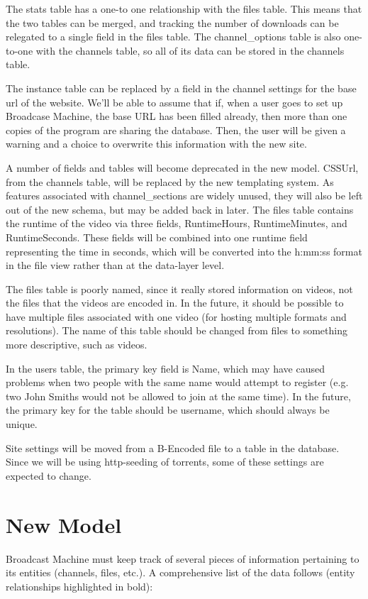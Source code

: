 \documentclass[a4paper,12pt]{report}
\begin{document}
The stats table has a one-to one relationship with the files table. This means that the two tables can be merged, and tracking the number of downloads can be relegated to a single field in the files table. The channel\_options table is also one-to-one with the channels table, so all of its data can be stored in the channels table.


The instance table can be replaced by a field in the channel settings for the base url of the website. We'll be able to assume that if, when a user goes to set up Broadcase Machine, the base URL has been filled already, then more than one copies of the program are sharing the database. Then, the user will be given a warning and a choice to overwrite this information with the new site.


A number of fields and tables will become deprecated in the new model. CSSUrl, from the channels table, will be replaced by the new templating system. As features associated with channel\_sections are widely unused, they will also be left out of the new schema, but may be added back in later. The files table contains the runtime of the video via three fields, RuntimeHours, RuntimeMinutes, and RuntimeSeconds. These fields will be combined into one runtime field representing the time in seconds, which will be converted into the h:mm:ss format in the file view rather than at the data-layer level.


The files table is poorly named, since it really stored information on videos, not the files that the videos are encoded in. In the future, it should be possible to have multiple files associated with one video (for hosting multiple formats and resolutions). The name of this table should be changed from files to something more descriptive, such as videos.


In the users table, the primary key field is Name, which may have caused problems when two people with the same name would attempt to register (e.g. two John Smiths would not be allowed to join at the same time). In the future, the primary key for the table should be username, which should always be unique.


Site settings will be moved from a B-Encoded file to a table in the database. Since we will be using http-seeding of torrents, some of these settings are expected to change.


\section{New Model}
Broadcast Machine must keep track of several pieces of information pertaining to its entities (channels, files, etc.).
A comprehensive list of the data follows (entity relationships highlighted in bold):
\end{document}

